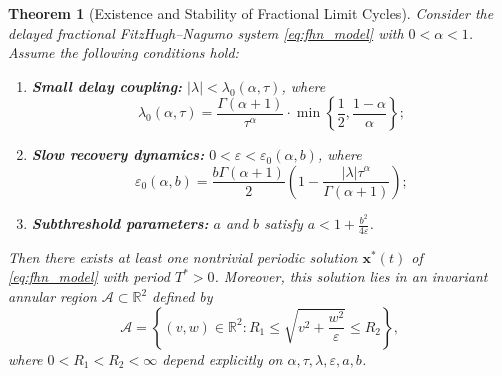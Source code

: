 \documentclass[10pt,a4paper]{amsart}
\newtheorem{theorem}{Theorem}
\begin{document}
\begin{theorem}[Existence and Stability of Fractional Limit Cycles]
	\label{thm:limit_cycle}
	Consider the delayed fractional FitzHugh--Nagumo system \eqref{eq:fhn_model} with $0<\alpha<1$. 
	Assume the following conditions hold:
	\begin{enumerate}
		\item \textbf{Small delay coupling:} $|\lambda| < \lambda_0(\alpha, \tau)$, where
		\begin{equation}
			\lambda_0(\alpha, \tau) = \frac{\Gamma(\alpha+1)}{\tau^\alpha} \cdot \min\left\{\frac{1}{2}, \frac{1-\alpha}{\alpha}\right\};
			\label{eq:lambda_condition}
		\end{equation}
		
		\item \textbf{Slow recovery dynamics:} $0 < \varepsilon < \varepsilon_0(\alpha, b)$, where
		\begin{equation}
			\varepsilon_0(\alpha, b) = \frac{b \Gamma(\alpha+1)}{2} \left(1 - \frac{|\lambda|\tau^\alpha}{\Gamma(\alpha+1)}\right);
			\label{eq:epsilon_condition}
		\end{equation}
		
		\item \textbf{Subthreshold parameters:} $a$ and $b$ satisfy $a < 1 + \frac{b^2}{4\varepsilon}$.
	\end{enumerate}
	Then there exists at least one nontrivial periodic solution $\mathbf{x}^*(t)$ of \eqref{eq:fhn_model} with period $T^* > 0$. Moreover, this solution lies in an invariant annular region $\mathcal{A} \subset \mathbb{R}^2$ defined by
	\begin{equation}
		\mathcal{A} = \left\{ (v,w) \in \mathbb{R}^2 : R_1 \leq \sqrt{v^2 + \frac{w^2}{\varepsilon}} \leq R_2 \right\},
		\label{eq:annular_region}
	\end{equation}
	where $0 < R_1 < R_2 < \infty$ depend explicitly on $\alpha, \tau, \lambda, \varepsilon, a, b$.
\end{theorem}
\end{document}
